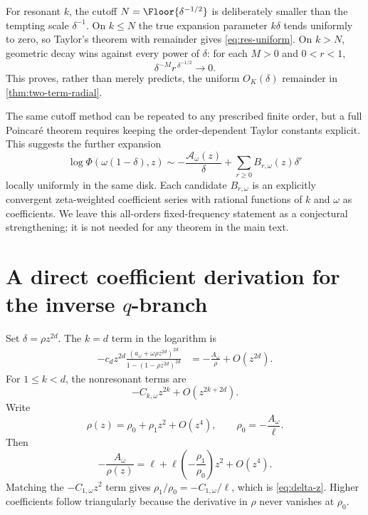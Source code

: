 \documentclass[11pt]{article}
\theoremstyle{definition}
\newcommand{\Aact}{\mathscr A}
\begin{document}
For resonant $k$, the cutoff $N=\Floor{\delta^{-1/2}}$ is deliberately
smaller than the tempting scale $\delta^{-1}$.  On $k\le N$ the true expansion
parameter $k\delta$ tends uniformly to zero, so Taylor's theorem with remainder
gives \cref{eq:res-uniform}.  On $k>N$, geometric decay wins against every
power of $\delta$: for each $M>0$ and $0<r<1$,
\begin{equation}
 \delta^{-M}r^{\,\delta^{-1/2}}\longrightarrow0.
 \label{eq:exp-beats-power}
\end{equation}
This proves, rather than merely predicts, the uniform $O_K(\delta)$ remainder
in \cref{thm:two-term-radial}.

The same cutoff method can be repeated to any prescribed finite order, but a
full Poincar\'e theorem requires keeping the order-dependent Taylor constants
explicit.  This suggests the further expansion
\begin{equation}
 \log\Phi(\omega(1-\delta),z)
 \sim -\frac{\Aact_\omega(z)}{\delta}
 +\sum_{r\ge0}B_{r,\omega}(z)\delta^r
 \label{eq:full-radial}
\end{equation}
locally uniformly in the same disk.  Each candidate $B_{r,\omega}$ is an
explicitly convergent zeta-weighted coefficient series with rational functions
of $k$ and $\omega$ as coefficients.  We leave this all-orders fixed-frequency
statement as a conjectural strengthening; it is not needed for any theorem in
the main text.

\section{A direct coefficient derivation for the inverse
\texorpdfstring{$q$}{q}-branch}

Set
\(
 \delta=\rho z^{2d}
\).  The $k=d$ term in the logarithm is
\begin{align}
 -c_dz^{2d}
 \frac{(a_\omega+\omega\rho z^{2d})^{2d}}
 {1-(1-\rho z^{2d})^{2d}}
 &=-\frac{A_\omega}{\rho}
 +O(z^{2d}).
 \label{eq:rho-leading}
\end{align}
For $1\le k<d$, the nonresonant terms are
\begin{equation}
 -C_{k,\omega}z^{2k}+O(z^{2k+2d}).
 \label{eq:rho-nonres}
\end{equation}
Write
\begin{equation}
 \rho(z)=\rho_0+\rho_1z^2+O(z^4),
 \qquad
 \rho_0=-\frac{A_\omega}{\ell}.
 \label{eq:rho-series}
\end{equation}
Then
\[
 -\frac{A_\omega}{\rho(z)}
 =\ell+\ell\left(-\frac{\rho_1}{\rho_0}\right)z^2+O(z^4).
\]
Matching the $-C_{1,\omega}z^2$ term gives
\(
 \rho_1/\rho_0=-C_{1,\omega}/\ell
\), which is \cref{eq:delta-z}.  Higher coefficients follow triangularly because the derivative in $\rho$ never vanishes at $\rho_0$.
\end{document}

